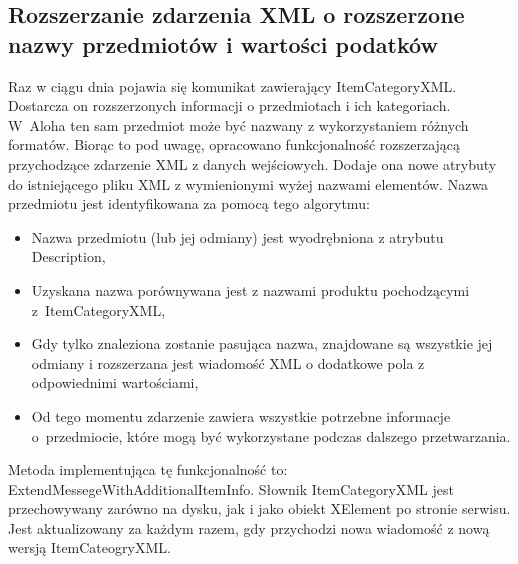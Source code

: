 \documentclass[a4paper]{book}
\begin{document}
\subsection{Rozszerzanie zdarzenia XML o rozszerzone nazwy przedmiotów i wartości podatków}
Raz w ciągu dnia pojawia się komunikat zawierający ItemCategoryXML. Dostarcza on rozszerzonych informacji o przedmiotach i ich kategoriach. W~Aloha ten sam przedmiot może być nazwany z wykorzystaniem różnych formatów.
Biorąc to pod uwagę, opracowano funkcjonalność rozszerzającą przychodzące zdarzenie XML z danych wejściowych.
Dodaje ona nowe atrybuty do istniejącego pliku XML z wymienionymi wyżej nazwami elementów. Nazwa przedmiotu jest identyfikowana za pomocą tego algorytmu:
\begin{itemize}
	\item Nazwa przedmiotu (lub jej odmiany) jest wyodrębniona z atrybutu Description,
	\item Uzyskana nazwa porównywana jest z nazwami produktu pochodzącymi z~ItemCategoryXML,
	\item Gdy tylko znaleziona zostanie pasująca nazwa, znajdowane są wszystkie jej odmiany i rozszerzana jest wiadomość XML o dodatkowe pola z odpowiednimi wartościami,
	\item Od tego momentu zdarzenie zawiera wszystkie potrzebne informacje o~przedmiocie, które mogą być wykorzystane podczas dalszego przetwarzania.
\end{itemize}
Metoda implementująca tę funkcjonalność to: ExtendMessegeWithAdditionalItemInfo.
Słownik ItemCategoryXML jest przechowywany zarówno na dysku, jak i jako obiekt XElement po stronie serwisu. Jest aktualizowany za każdym razem, gdy przychodzi nowa wiadomość z nową wersją ItemCateogryXML.
\end{document}

